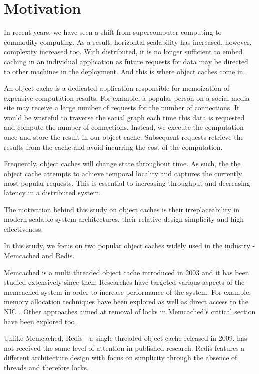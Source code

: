 \section{Motivation}

In recent years, we have seen a shift from supercomputer computing to commodity computing. As a result, horizontal scalability has increased, however, complexity increased too. With distributed, it is no longer sufficient to embed caching in an individual application as future requests for data may be directed to other machines in the deployment. And this is where object caches come in.

An object cache is a dedicated application responsible for memoization of expensive computation results. For example, a popular person on a social media site may receive a large number of requests for the number of connections. It would be wasteful to traverse the social graph each time this data is requested and compute the number of connections. Instead, we execute the computation once and store the result in our object cache. Subsequent requests retrieve the results from the cache and avoid incurring the cost of the computation.

Frequently, object caches will change state throughout time. As such, the the object cache attempts to achieve temporal locality and captures the currently most popular requests. This is essential to increasing throughput and decreasing latency in a distributed system.

The motivation behind this study on object caches is their irreplaceability in modern scalable system architectures, their relative design simplicity and high effectiveness.

In this study, we focus on two popular object caches widely used in the industry - Memcached and Redis.

Memcached is a multi threaded object cache introduced in 2003 and it has been studied extensively since then. Researches have targeted various aspects of the memcached system in order to increase performance of the system. For example, memory allocation techniques have been explored as well as direct access to the NIC \cite{lim2014mica}. Other approaches aimed at removal of locks in Memcached's critical section have been explored too \cite{wiggins2012enhancing}.

Unlike Memcached, Redis - a single threaded object cache released in 2009, has not received the same level of attention in published research. Redis features a different architecture design with focus on simplicity through the absence of threads and therefore locks.

